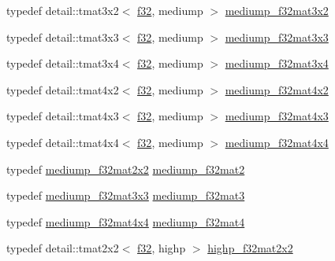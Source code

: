 \begin{CompactItemize}
\item 
typedef detail::tmat3x2$<$ \hyperlink{group__gtc__type__precision_g0ec999b57f5330d9021256e96038df04}{f32}, mediump $>$ \hyperlink{group__gtc__type__precision_g9762d48bb9b41e3cf40f6e616cf61b6b}{mediump\_\-f32mat3x2}
\item 
typedef detail::tmat3x3$<$ \hyperlink{group__gtc__type__precision_g0ec999b57f5330d9021256e96038df04}{f32}, mediump $>$ \hyperlink{group__gtc__type__precision_gd4d01189a1462366b143c5cbc3de0ea9}{mediump\_\-f32mat3x3}
\item 
typedef detail::tmat3x4$<$ \hyperlink{group__gtc__type__precision_g0ec999b57f5330d9021256e96038df04}{f32}, mediump $>$ \hyperlink{group__gtc__type__precision_g7ad59b967576d930f4c8aa7b8c48e1af}{mediump\_\-f32mat3x4}
\item 
typedef detail::tmat4x2$<$ \hyperlink{group__gtc__type__precision_g0ec999b57f5330d9021256e96038df04}{f32}, mediump $>$ \hyperlink{group__gtc__type__precision_g3400d5463f0a58cf3959406aa2b69f72}{mediump\_\-f32mat4x2}
\item 
typedef detail::tmat4x3$<$ \hyperlink{group__gtc__type__precision_g0ec999b57f5330d9021256e96038df04}{f32}, mediump $>$ \hyperlink{group__gtc__type__precision_g31635d753ab8a19fdaa80d2b89e90c54}{mediump\_\-f32mat4x3}
\item 
typedef detail::tmat4x4$<$ \hyperlink{group__gtc__type__precision_g0ec999b57f5330d9021256e96038df04}{f32}, mediump $>$ \hyperlink{group__gtc__type__precision_g8f83086fffe71f9cd15e75a1de101ba6}{mediump\_\-f32mat4x4}
\item 
typedef \hyperlink{group__gtc__type__precision_g23c9239d6aa9b41c3d2145e2faa81edb}{mediump\_\-f32mat2x2} \hyperlink{group__gtc__type__precision_g103735a38477f7c389b36aae0fbdf274}{mediump\_\-f32mat2}
\item 
typedef \hyperlink{group__gtc__type__precision_gd4d01189a1462366b143c5cbc3de0ea9}{mediump\_\-f32mat3x3} \hyperlink{group__gtc__type__precision_ge263a08ef179894fdd36f9a51698c4ab}{mediump\_\-f32mat3}
\item 
typedef \hyperlink{group__gtc__type__precision_g8f83086fffe71f9cd15e75a1de101ba6}{mediump\_\-f32mat4x4} \hyperlink{group__gtc__type__precision_g56bd98ec31b6abc0315d688d4ecd94a0}{mediump\_\-f32mat4}
\item 
typedef detail::tmat2x2$<$ \hyperlink{group__gtc__type__precision_g0ec999b57f5330d9021256e96038df04}{f32}, highp $>$ \hyperlink{group__gtc__type__precision_gf3a2cc948ca6fd168391138ce6fdd100}{highp\_\-f32mat2x2}
\item 

\end{CompactItemize}
